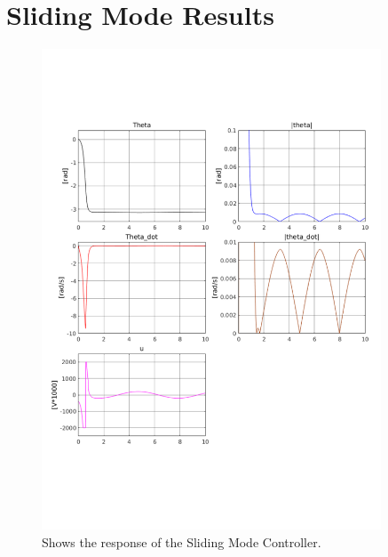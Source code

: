 \chapter{Sliding Mode Results} %
\label{cha:sliding_mode}
\begin{figure}[H]
        \centering
        \includegraphics[width=0.9\textwidth,trim=0.5cm 5cm 0.5cm 4cm, clip]{smc.pdf}
        \caption{Shows the response of the Sliding Mode Controller.}
        \label{fig:smc}
\end{figure}

